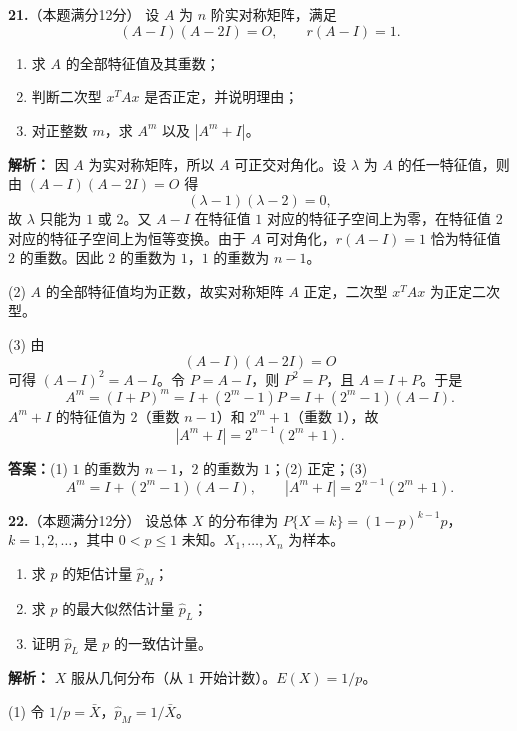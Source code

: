 \vspace{8pt}

\textbf{21.}（本题满分12分）
设 $A$ 为 $n$ 阶实对称矩阵，满足
\[
(A-I)(A-2I)=O,\qquad r(A-I)=1.
\]
\begin{enumerate}
    \item[(1)] 求 $A$ 的全部特征值及其重数；
    \item[(2)] 判断二次型 $x^TAx$ 是否正定，并说明理由；
    \item[(3)] 对正整数 $m$，求 $A^m$ 以及 $|A^m+I|$。
\end{enumerate}

\ifshowsolutions\par\noindent\textbf{解析：} 因 $A$ 为实对称矩阵，所以 $A$ 可正交对角化。设 $\lambda$ 为 $A$ 的任一特征值，则由 $(A-I)(A-2I)=O$ 得
\[
(\lambda-1)(\lambda-2)=0,
\]
故 $\lambda$ 只能为 $1$ 或 $2$。又 $A-I$ 在特征值 $1$ 对应的特征子空间上为零，在特征值 $2$ 对应的特征子空间上为恒等变换。由于 $A$ 可对角化，$r(A-I)=1$ 恰为特征值 $2$ 的重数。因此 $2$ 的重数为 $1$，$1$ 的重数为 $n-1$。

(2) $A$ 的全部特征值均为正数，故实对称矩阵 $A$ 正定，二次型 $x^TAx$ 为正定二次型。

(3) 由
\[
(A-I)(A-2I)=O
\]
可得 $(A-I)^2=A-I$。令 $P=A-I$，则 $P^2=P$，且 $A=I+P$。于是
\[
A^m=(I+P)^m=I+(2^m-1)P=I+(2^m-1)(A-I).
\]
$A^m+I$ 的特征值为 $2$（重数 $n-1$）和 $2^m+1$（重数 $1$），故
\[
|A^m+I|=2^{n-1}(2^m+1).
\]
\par\noindent\textbf{答案：}(1) $1$ 的重数为 $n-1$，$2$ 的重数为 $1$；(2) 正定；(3)
\[
A^m=I+(2^m-1)(A-I),\qquad |A^m+I|=2^{n-1}(2^m+1).
\]
\else \answerarea[8] \fi

\vspace{8pt}

\textbf{22.}（本题满分12分）
设总体 $X$ 的分布律为 $P\{X=k\}=(1-p)^{k-1}p$，$k=1,2,\ldots$，其中 $0<p\leqslant1$ 未知。$X_1,\ldots,X_n$ 为样本。
\begin{enumerate}
    \item[(1)] 求 $p$ 的矩估计量 $\hat{p}_M$；
    \item[(2)] 求 $p$ 的最大似然估计量 $\hat{p}_L$；
    \item[(3)] 证明 $\hat{p}_L$ 是 $p$ 的一致估计量。
\end{enumerate}

\ifshowsolutions\par\noindent\textbf{解析：} $X$ 服从几何分布（从 $1$ 开始计数）。$E(X)=1/p$。

(1) 令 $1/p=\bar{X}$，$\hat{p}_M = 1/\bar{X}$。

